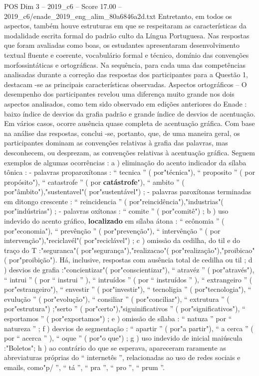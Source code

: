 \begin{textsample}{POS Dim 3 – 2019\_c6 – Score 17.00 – 2019\_c6/enade\_2019\_eng\_alim\_80a6846a2d.txt}
Entretanto, em todos os aspectos, também houve estruturas em que se respeitaram as características da modalidade escrita formal do padrão culto da Língua Portuguesa.
Nas respostas que foram avaliadas como boas, os estudantes apresentaram desenvolvimento textual fluente e coerente, vocabulário formal e técnico, domínio das convenções morfossintáticas e ortográficas.
Na sequência, para cada uma das competências analisadas durante a correção das respostas dos participantes para a Questão 1, destacam -se as principais características observadas.
Aspectos ortográficos – O desempenho dos participantes revelou uma diferença muito grande nos dois aspectos analisados, como tem sido observado em edições anteriores do Enade : baixo índice de desvios da grafia padrão e grande índice de desvios de acentuação.
Em vários casos, ocorre ausência quase completa de acentuação gráfica.
Com base na análise das respostas, conclui -se, portanto, que, de uma maneira geral, os participantes dominam as convenções relativas à grafia das palavras, mas desconhecem, ou desprezam, as convenções relativas à acentuação gráfica.
Seguem exemplos de algumas ocorrências : a ) eliminação do acento indicador da sílaba tônica : - palavras proparoxítonas : “ tecnica ” ( por"técnica"), “ proposito ” ( por propósito"), “ catastrofe ” ( por \textbf{catástrofe}"), “ ambito ” ( por"âmbito"),"sustentavel"( por"sustentável") ; - palavras paroxítonas terminadas em ditongo crescente : “ reincidencia ” ( por"reincidência"),"industrias"( por"indústrias") ; - palavras oxítonas : “ comite ” ( por"comitê") ; b ) uso indevido do acento gráfico, \textbf{localizado} em sílaba átona : “ ecônomia ” ( por"economia"), “ prevênção ” ( por"prevenção"), “ intervênção ” ( por intervenção"),"reciclavél"( por"reciclável") ; c ) omissão da cedilha, do til e do traço do T :"seguranca"( por"segurança"),"realizacao"( por"realização"),"proibicao"( por"proibição").
Há, inclusive, respostas com ausência total de cedilha ou til ; d ) desvios de grafia :"concientizar"( por"conscientizar"), “ atravéz ” ( por"através"), “ intrui ” ( por “ instrui ” ), “ intruídos ” ( por “ instruídos ” ), “ extrangeiro ” ( por"estrangeiro"), “ envestir ” ( por"investir"), “ tecnoligia ” ( por"tecnologia"), “ evulução ” ( por"evolução"), “ consiliar ” ( por"conciliar"), “ extrutura ” ( por"estrutura") ;"serto ” ( por"certo"),"siguinificativos ” ( por"significativos"), “ esportamos ” ( por"exportamos") ; e ) omissão de sílaba : “ natuza ” por “ natureza ” ; f ) desvios de segmentação : “ apartir ” ( por"a partir"), “ a cerca ” ( por “ acerca ” ), “ oque ” ( por"o que") ; g ) uso indevido de inicial maiúscula :"Boletos"; h ) ao contrário do que se esperava, apareceram raramente as abreviaturas próprias do “ internetês ”, relacionadas ao uso de redes sociais e emails, como"p/ ”, “ tá ”, “ pra ”, “ pro ”, “ prum ”.

\end{textsample}
